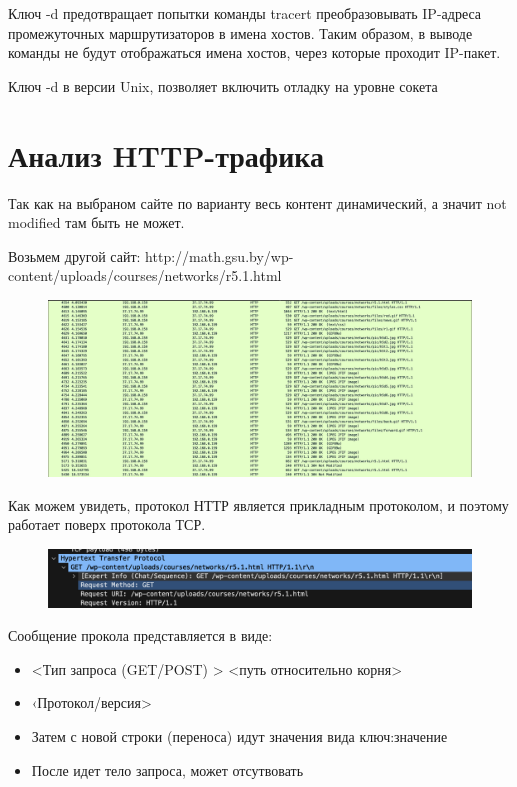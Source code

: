 \documentclass[12pt,onecolumn]{article}
\begin{document}
\begin{itemize}
{        Ключ -d предотвращает попытки команды tracert преобразовывать IP-адреса промежуточных маршрутизаторов в имена хостов. Таким образом, в выводе команды не будут отображаться имена хостов, через которые проходит IP-пакет.

        Ключ -d в версии Unix, позволяет включить отладку на уровне сокета
    }
    \section{Анализ HTTP-трафика}

    Так как на выбраном сайте по варианту весь контент динамический, а значит not modified там быть не может.
    
    Возьмем другой сайт: http://math.gsu.by/wp-content/uploads/courses/networks/r5.1.html

    \begin{figure}[H]
        \centering
        \includegraphics*[width=\textwidth]{image/part3/http.png}
    \end{figure}

    Как можем увидеть, протокол НТТР
    является прикладным протоколом, и поэтому работает поверх протокола ТСР.
    
    \begin{figure}[H]
        \centering
        \includegraphics*[width=\textwidth]{image/part3/get-request.png}
    \end{figure}
    Сообщение прокола представляется в виде:
    \begin{itemize}
        \item <Тип запроса (GET/POST) > <путь относительно корня>
        \item ‹Протокол/версия>
        \item Затем с новой строки (переноса) идут значения вида ключ:значение
        \item После идет тело запроса, может отсутвовать
    \end{itemize}


\end{itemize}
\end{document}
